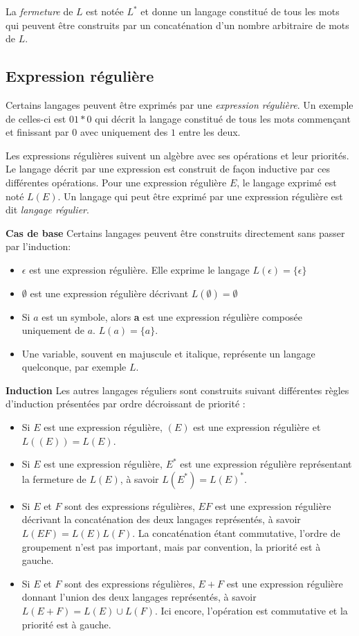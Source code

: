 La \emph{fermeture} de $L$ est notée $L^*$ et donne un langage constitué de tous les mots qui peuvent être construits par un concaténation d'un nombre arbitraire de mots de $L$.

\subsection{Expression régulière}

Certains langages peuvent être exprimés par une \emph{expression régulière}. Un exemple de celles-ci est $01*0$ qui décrit la langage constitué de tous les mots commençant et finissant par $0$ avec uniquement des $1$ entre les deux.

Les expressions régulières suivent un algèbre avec ses opérations et leur priorités. Le langage décrit par une expression est construit de façon inductive par ces différentes opérations. Pour une expression régulière $E$, le langage exprimé est noté $L(E)$. Un langage qui peut être exprimé par une expression régulière est dit \emph{langage régulier}.


\textbf{Cas de base}
Certains langages peuvent être construits directement sans passer par l'induction:

\begin{itemize}
	\item $\epsilon$ est une expression régulière. Elle exprime le langage $L(\epsilon)=\{\epsilon\}$
	\item $\emptyset$ est une expression régulière décrivant $L(\emptyset)=\emptyset$
	\item Si $a$ est un symbole, alors \textbf{a} est une expression régulière composée uniquement de $a$. $L(a) = \{a\}$.
	\item Une variable, souvent en majuscule et italique, représente un langage quelconque, par exemple $L$.
\end{itemize}


\textbf{Induction}
Les autres langages réguliers sont construits suivant différentes règles d'induction présentées par ordre décroissant de priorité :

\begin{itemize}
	\item Si $E$ est une expression régulière, $(E)$ est une expression régulière et $L((E)) = L(E)$.
	\item Si $E$ est une expression régulière, $E^*$ est une expression régulière représentant la fermeture de $L(E)$, à savoir $L(E^*) = L(E)^*$.
	\item Si $E$ et $F$ sont des expressions régulières, $EF$ est une expression régulière décrivant la concaténation des deux langages représentés, à savoir $L(EF)=L(E)L(F)$. La concaténation étant commutative, l'ordre de groupement n'est pas important, mais par convention, la priorité est à gauche.
	\item Si $E$ et $F$ sont des expressions régulières, $E+F$ est une expression régulière donnant l'union des deux langages représentés, à savoir $L(E+F)=L(E)\cup L(F)$. Ici encore, l'opération est commutative et la priorité est à gauche.
\end{itemize}
	
